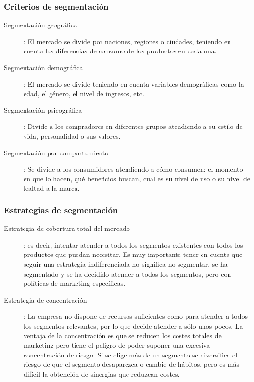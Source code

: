 \documentclass[10pt,a4paper,spanish]{report}
\begin{document}
			\subsubsection{\textcolor[rgb]{0.1,0.2,0.4}Criterios de segmentación}

				\begin{description}
					\item[Segmentación geográfica]: El mercado se divide por naciones, regiones o ciudades, teniendo en cuenta las diferencias de consumo de los productos en cada una.

					\item[Segmentación demográfica]: El mercado se divide teniendo en cuenta variables demográficas como la edad, el género, el nivel de ingresos, etc.

					\item[Segmentación psicográfica]: Divide a los compradores en diferentes grupos atendiendo a su estilo de vida, personalidad o sus valores.

					\item[Segmentación por comportamiento]: Se divide a los consumidores atendiendo a cómo consumen: el momento en que lo hacen, qué beneficios buscan, cuál es su nivel de uso o su nivel de lealtad a la marca.
				\end{description}

			\subsubsection{\textcolor[rgb]{0.1,0.2,0.4}Estrategias de segmentación}

				\begin{description}
					\item[Estrategia de cobertura total del mercado]: es decir, intentar atender a todos los segmentos existentes con todos los productos que puedan necesitar. Es muy importante tener en cuenta que seguir una estrategia indiferenciada no significa no segmentar, se ha segmentado y se ha decidido atender a todos los segmentos, pero con políticas de marketing específicas.

					\item[Estrategia de concentración]: La empresa no dispone de recursos suficientes como para atender a todos los segmentos relevantes, por lo que decide atender a sólo unos pocos. La ventaja de la concentración es que se reducen los costes totales de marketing pero tiene el peligro de poder suponer una excesiva concentración de riesgo. Si se elige más de un segmento se diversifica el riesgo de que el segmento desaparezca o cambie de hábitos, pero es más difícil la obtención de sinergias que reduzcan costes.
				\end{description}
\end{document}
